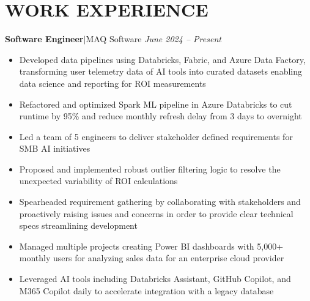 \documentclass[11pt, a4paper, roman]{moderncv}
\newcommand{\entry}[4]{
	\textbf{#2}\:$|$\:#1 
	\hfill\textit{#3}
	#4
	\vspace{2mm}
}
\begin{document}
\vspace{4mm}
\linespread{2}
\maketitle
\linespread{1}
\vspace*{-14mm}



\section{WORK EXPERIENCE}

\entry{MAQ Software}{Software Engineer}{June 2024 -- Present}
{\begin{itemize}
	\item Developed data pipelines using Databricks, Fabric, and Azure Data Factory, transforming user telemetry data of AI tools into curated datasets enabling data science and reporting for ROI measurements
	\item Refactored and optimized Spark ML pipeline in Azure Databricks to cut runtime by 95\% and reduce monthly refresh delay from 3 days to overnight
	\item Led a team of 5 engineers to deliver stakeholder defined requirements for SMB AI initiatives
	\item Proposed and implemented robust outlier filtering logic to resolve the unexpected variability of ROI calculations
	\item Spearheaded requirement gathering by collaborating with stakeholders and proactively raising issues and concerns in order to provide clear technical specs streamlining development
	\item Managed multiple projects creating Power BI dashboards with 5,000+ monthly users for analyzing sales data for an enterprise cloud provider
	\item Leveraged AI tools including Databricks Assistant, GitHub Copilot, and M365 Copilot daily to accelerate integration with a legacy database 
\end{itemize}
}
\end{document}
